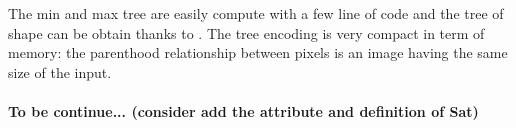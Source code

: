 The min and max tree are easily compute with a few line of code \cite{berger.07.icip} and the tree of shape can be obtain thanks to \cite{geraud.13.ismm}. The tree encoding is very compact in term of memory: the parenthood relationship between pixels is an image having the same size of the input. 

	
\paragraph{To be continue... (consider add the attribute and definition of Sat)}
